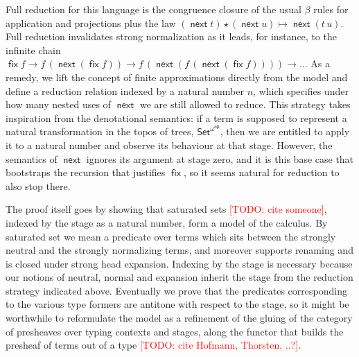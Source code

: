 \documentclass{book}
\newcommand{\TODO}[1]{\textcolor{red}{[TODO: #1]}}
\DeclareMathOperator{\fix}{\mathsf{fix}}
\newcommand{\red}{\to}
\DeclareMathOperator{\next}{\ensuremath{\mathsf{next}}}
\begin{document}
  Full reduction for this language
  is the congruence closure of the usual $\beta$ rules
  for application and projections plus the law $(\next t)
  \star (\next u) \mapsto \next (t\,u)$.
  Full reduction invalidates strong normalization as it leads,
  for instance, to the infinite chain
  $\fix f \red f\,(\next (\fix f)) \red f\,(\next (f\,(\next (\fix f)))) \red
  \ldots$
%
  As a remedy, we lift the concept of finite approximations directly from
  the model and define a reduction relation indexed by a natural
  number $n$, which specifies under how many nested uses of $\next$ we
  are still allowed to reduce.
%
  This strategy takes inspiration from the denotational semantics: if
  a term is supposed to represent a natural transformation in the
  topos of trees, $\mathsf{Set}^{\omega^\mathsf{op}}$, then we are
  entitled to apply it to a natural number and observe its behaviour
  at that stage.  However, the semantics of $\next$ ignores its argument at
  stage zero, and it is this base case that bootstraps the recursion
  that justifies $\fix$, so it seems natural for reduction to also
  stop there.

  The proof itself goes by showing that saturated sets \TODO{cite someone},
  indexed by the stage as a natural number, form a model of the
  calculus. By saturated set we mean a predicate over terms which sits
  between the strongly neutral and the strongly normalizing terms, and
  moreover supports renaming and is closed under strong head
  expansion. Indexing by the stage is necessary because our notions
  of neutral, normal and expansion inherit the stage from the
  reduction strategy indicated above.
  Eventually we prove that the predicates corresponding to the various
  type formers are antitone with respect to the stage, so it might be
  worthwhile to reformulate the model as a refinement of the gluing of
  the category of presheaves over typing contexts and stages, along the functor that
  builds the presheaf of terms out of a type \TODO{cite Hofmann, Thorsten, ..?}.
\end{document}
